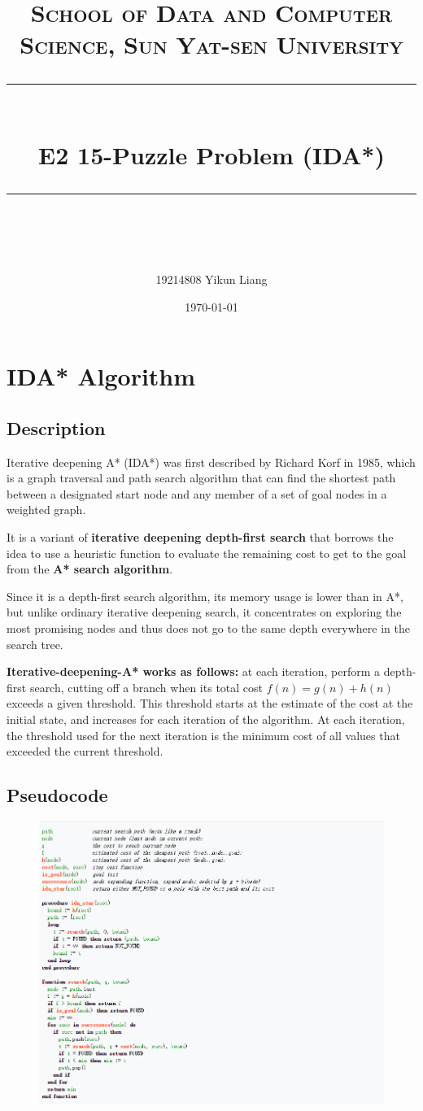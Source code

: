 \documentclass[a4paper, 11pt]{article}
\title{	
\normalfont \normalsize
\textsc{School of Data and Computer Science, Sun Yat-sen University} \\ [25pt] %
\rule{\textwidth}{0.5pt} \\[0.4cm] %
\huge  E2 15-Puzzle Problem (IDA*)\\ %
\rule{\textwidth}{2pt} \\[0.5cm] %
\author{19214808 Yikun Liang}
\date{\normalsize\today}
}
\begin{document}
\maketitle
\tableofcontents
\newpage

\section{IDA* Algorithm}
\subsection{Description}
Iterative deepening A* (IDA*) was first described by Richard Korf in 1985, which is a graph traversal and path search algorithm that can find the shortest path between a designated start node and any member of a set of goal nodes in a weighted graph. 

It is a variant of \textbf{iterative deepening depth-first search} that borrows the idea to use a heuristic function to evaluate the remaining cost to get to the goal from the \textbf{A* search algorithm}. 

Since it is a depth-first search algorithm, its memory usage is lower than in A*, but unlike ordinary iterative deepening search, it concentrates on exploring the most promising nodes and thus does not go to the same depth everywhere in the search tree. 

\textbf{Iterative-deepening-A* works as follows:} at each iteration, perform a depth-first search, cutting off a branch when its total cost $f(n)=g(n)+h(n)$ exceeds a given threshold. This threshold starts at the estimate of the cost at the initial state, and increases for each iteration of the algorithm. At each iteration, the threshold used for the next iteration is the minimum cost of all values that exceeded the current threshold.
\subsection{Pseudocode}
\begin{figure}[ht]
\centering
\includegraphics[width=17.3cm]{Pic/code}
\end{figure}
\end{document}
